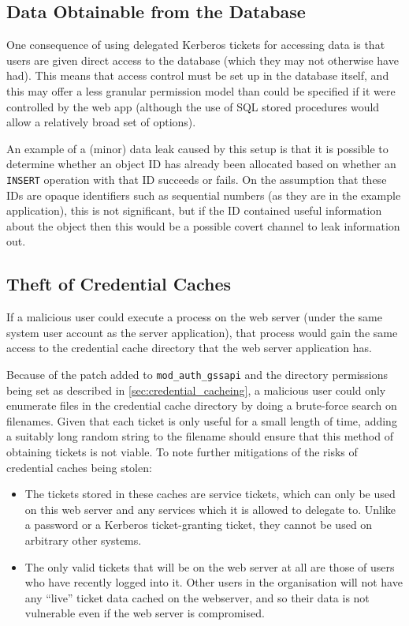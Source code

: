 \documentclass[12pt]{report}
\begin{document}
\subsection{Data Obtainable from the Database}
One consequence of using delegated Kerberos tickets for accessing data is that users are given direct access to the database (which they may not otherwise have had). This means that access control must be set up in the database itself, and this may offer a less granular permission model than could be specified if it were controlled by the web app (although the use of SQL stored procedures would allow a relatively broad set of options).

An example of a (minor) data leak caused by this setup is that it is possible to determine whether an object ID has already been allocated based on whether an \texttt{INSERT} operation with that ID succeeds or fails. On the assumption that these IDs are opaque identifiers such as sequential numbers (as they are in the example application), this is not significant, but if the ID contained useful information about the object then this would be a possible covert channel to leak information out.

\subsection{Theft of Credential Caches}
\label{sec:theft_of_credential_caches}
If a malicious user could execute a process on the web server (under the same system user account as the server application), that process would gain the same access to the credential cache directory that the web server application has.

Because of the patch added to \verb+mod_auth_gssapi+ and the directory permissions being set as described in \autoref{sec:credential_cacheing}, a malicious user could only enumerate files in the credential cache directory by doing a brute-force search on filenames. Given that each ticket is only useful for a small length of time, adding a suitably long random string to the filename should ensure that this method of obtaining tickets is not viable. To note further mitigations of the risks of credential caches being stolen:

\begin{itemize}
\item
  The tickets stored in these caches are service tickets, which can only be used on this web server and any services which it is allowed to delegate to. Unlike a password or a Kerberos ticket-granting ticket, they cannot be used on arbitrary other systems.
\item
  The only valid tickets that will be on the web server at all are those of users who have recently logged into it. Other users in the organisation will not have any ``live'' ticket data cached on the webserver, and so their data is not vulnerable even if the web server is compromised.
\end{itemize}
\end{document}
